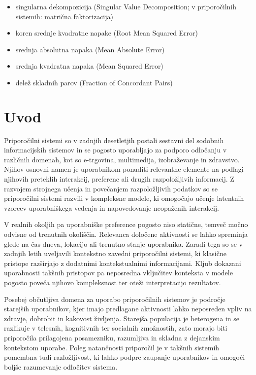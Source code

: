 \documentclass[a4paper,twoside,openright,12pt,slovene]{book}
\begin{document}
\seznamkratic
\begin{itemize}[leftmargin=*,itemsep=2pt]
  \item[SVD] singularna dekompozicija (Singular Value Decomposition; v priporočilnih sistemih: matrična faktorizacija)
  \item[RMSE] koren srednje kvadratne napake (Root Mean Squared Error)
  \item[MAE] srednja absolutna napaka (Mean Absolute Error)
  \item[MSE] srednja kvadratna napaka (Mean Squared Error)
  \item[FCP] delež skladnih parov (Fraction of Concordant Pairs)
\end{itemize}

\mainmatter

\chapter{Uvod} \label{uvod}
Priporočilni sistemi so v zadnjih desetletjih postali sestavni del sodobnih
informacijskih sistemov in se pogosto uporabljajo za podporo odločanju v
različnih domenah, kot so e-trgovina, multimedija, izobraževanje in zdravstvo.
Njihov osnovni namen je uporabnikom ponuditi relevantne elemente na podlagi
njihovih preteklih interakcij, preferenc ali drugih razpoložljivih informacij.
Z razvojem strojnega učenja in povečanjem razpoložljivih podatkov so se
priporočilni sistemi razvili v kompleksne modele, ki omogočajo učenje
latentnih vzorcev uporabniškega vedenja in napovedovanje neopaženih
interakcij.

V realnih okoljih pa uporabniške preference pogosto niso statične, temveč
močno odvisne od trenutnih okoliščin. Relevanca določene aktivnosti se lahko
spreminja glede na čas dneva, lokacijo ali trenutno stanje uporabnika. Zaradi
tega so se v zadnjih letih uveljavili kontekstno zavedni priporočilni sistemi,
ki klasične pristope razširjajo z dodatnimi kontekstualnimi informacijami.
Kljub dokazani uporabnosti takšnih pristopov pa neposredna vključitev
konteksta v modele pogosto poveča njihovo kompleksnost ter oteži
interpretacijo rezultatov.

Posebej občutljiva domena za uporabo priporočilnih sistemov je področje
starejših uporabnikov, kjer imajo predlagane aktivnosti lahko neposreden
vpliv na zdravje, dobrobit in kakovost življenja. Starejša populacija je
heterogena in se razlikuje v telesnih, kognitivnih ter socialnih zmožnostih,
zato morajo biti priporočila prilagojena posamezniku, razumljiva in skladna z
dejanskim kontekstom uporabe. Poleg natančnosti priporočil je v takšnih
sistemih pomembna tudi razložljivost, ki lahko podpre zaupanje
uporabnikov in omogoči boljše razumevanje odločitev sistema.
\end{document}
